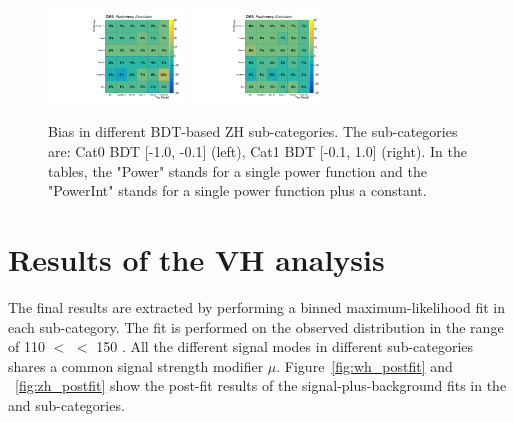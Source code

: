 \begin{figure}[!htb]
  \centering
  \captionsetup{justification=justified}
  \includegraphics[width=0.32\textwidth]{pics/VH_sec/Bias_study/pulls_ZH_BDT_n10_n01_signal_strength_1_table.pdf}
  \includegraphics[width=0.32\textwidth]{pics/VH_sec/Bias_study/pulls_ZH_BDT_n01_p10_signal_strength_1_table.pdf}
  \caption{Bias in different BDT-based ZH sub-categories. The sub-categories are: Cat0 BDT [-1.0, -0.1] (left), Cat1 BDT [-0.1, 1.0] (right). In the tables, the "Power" stands for a single power function and the "PowerInt" stands for a single power function plus a constant.}
  \label{fig:zh_bias_study}
\end{figure}



\clearpage
\section{Results of the VH analysis}\label{sec:vh_results}

The final results are extracted by performing a binned maximum-likelihood fit in each \VH sub-category.
The fit is performed on the observed \mmm distribution in the range of 110 $<$ \mmm $<$ 150 \GeV.
All the different signal modes in different sub-categories shares a common signal strength modifier $\mu$.
Figure~\ref{fig:wh_postfit} and ~\ref{fig:zh_postfit} show the post-fit results of the signal-plus-background fits in the \WH and \ZH sub-categories.

